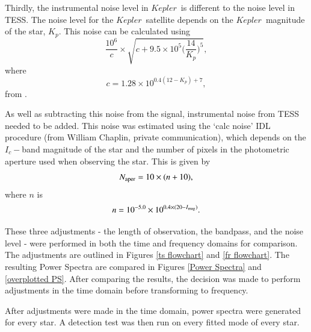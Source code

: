 \documentclass[a4paper,fleqn,usenatbib,useAMS]{mnras}
\newcommand{\kep}{\ensuremath{Kepler}\:}
\begin{document}
Thirdly, the instrumental noise level in \kep \ is different to the noise level in TESS. The noise level for the \kep \ satellite depends on the \kep \ magnitude of the star, $K_{p}$. This noise can be calculated using
\begin{equation}
\label{eq:kep noise}
\frac{10^{6}}{c} \times \sqrt{c+9.5 \times 10^{5}\Bigg(\frac{14}{K_{p}}\Bigg)^{5}} ,
\end{equation}
where
\begin{equation}
c = 1.28 \times 10^{0.4(12-K_{p})+7} ,
\end{equation}
from \citet{chaplin_predicting_2011}.

As well as subtracting this noise from the signal, instrumental noise from TESS needed to be added. This noise was estimated using the `calc noise' IDL procedure (from William Chaplin, private communication), which depends on the $I_{c}-$band magnitude of the star and the number of pixels in the photometric aperture used when observing the star. This is given by
\begin{equation}
N_{\rm aper} = 10 \times (n+10) , 
\end{equation}
where $n$ is
\begin{equation}
\label{eq:tess noise}
n = 10^{-5.0} \times 10^{ 0.4 \times (20-I_{\rm mag})} .
\end{equation}

These three adjustments - the length of observation, the bandpass, and the noise level - were performed in both the time and frequency domains for comparison. The adjustments are outlined in Figures \ref{ts flowchart} and \ref{fr flowchart}. The resulting Power Spectra are compared in Figures \ref{Power Spectra} and \ref{overplotted PS}. After comparing the results, the decision was made to perform adjustments in the time domain before transforming to frequency. 

After adjustments were made in the time domain, power spectra were generated for every star. A detection test was then run on every fitted mode of every star. 
\end{document}
